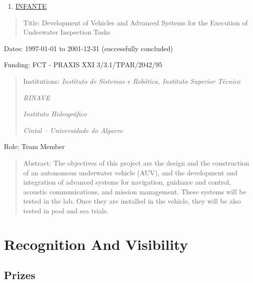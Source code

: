 \documentclass[
]{article}
\begin{document}
\begin{enumerate}
\def\labelenumi{\arabic{enumi}.}
\setcounter{enumi}{21}
\item
  \ul{INFANTE}
\end{enumerate}

\begin{quote}
Title: Development of Vehicles and Advanced Systems for the Execution of
Underwater Inspection Tasks
\end{quote}

Dates: 1997-01-01 to 2001-12-31 (successfully concluded)

Funding: FCT - PRAXIS XXI 3/3.1/TPAR/2042/95

\begin{quote}
Institutions: \emph{Instituto de Sistemas e Robótica, Instituto Superior
Técnico}

\emph{RINAVE}

\emph{Instituto Hidrográfico}

\emph{Cintal -- Universidade do Algarve}
\end{quote}

Role: Team Member

\begin{quote}
Abstract: The objectives of this project are the design and the
construction of an autonomous underwater vehicle (AUV), and the
development and integration of advanced systems for navigation, guidance
and control, acoustic communications, and mission management. These
systems will be tested in the lab. Once they are installed in the
vehicle, they will be also tested in pool and sea trials.
\end{quote}

\section{Recognition And Visibility}\label{recognition-and-visibility-1}

\subsection{Prizes}\label{prizes}
\end{document}
